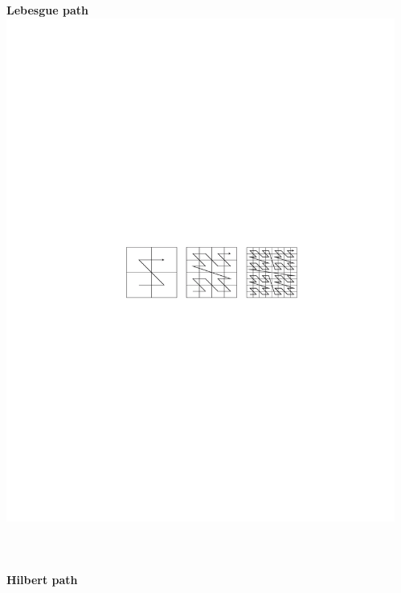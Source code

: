 \documentclass[mathserif, 8pt]{beamer}
\begin{document}
\begin{frame}
\begin{columns}
\begin{column}{0.4\textwidth}
    \end{column}
    \begin{column}{0.6\textwidth}
	\centering
	\textbf{Lebesgue path}
	\includegraphics[scale=0.5, viewport = 150 350 500 435, clip]{figures/lebesgue.pdf}
	\ \\
	\ \\
	\ \\
	\textbf{Hilbert path}

\end{column}
\end{columns}
\end{frame}
\end{document}
